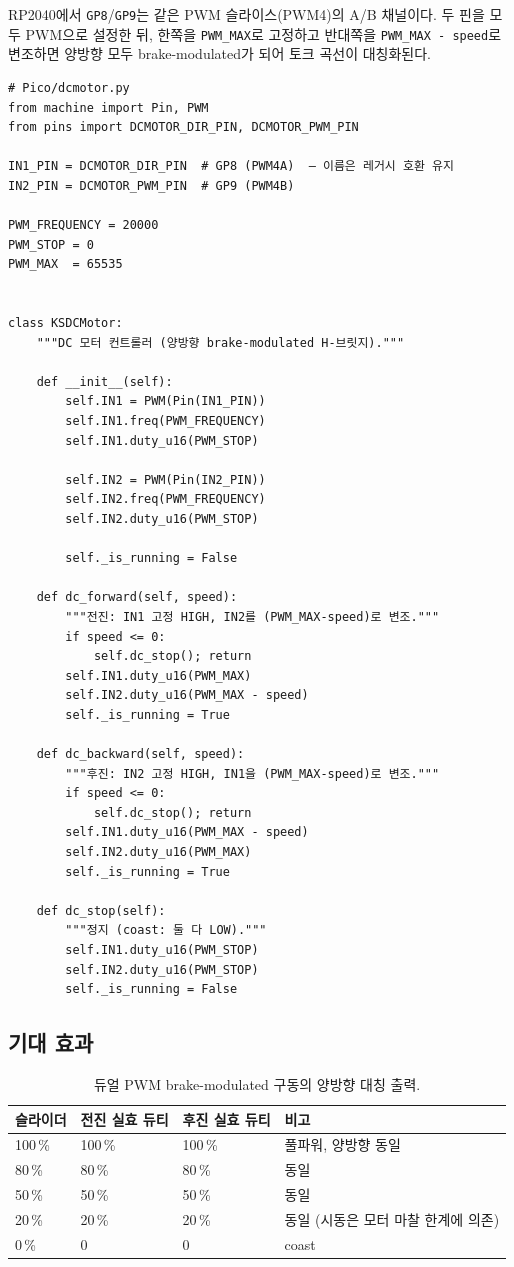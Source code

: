 \documentclass[11pt, oneside]{article}
\begin{document}
RP2040에서 \texttt{GP8}/\texttt{GP9}는 같은 PWM 슬라이스(PWM4)의 A/B
채널이다. 두 핀을 모두 PWM으로 설정한 뒤, 한쪽을 \texttt{PWM\_MAX}로
고정하고 반대쪽을 \texttt{PWM\_MAX - speed}로 변조하면 양방향 모두
brake-modulated가 되어 토크 곡선이 대칭화된다.

\begin{verbatim}
# Pico/dcmotor.py
from machine import Pin, PWM
from pins import DCMOTOR_DIR_PIN, DCMOTOR_PWM_PIN

IN1_PIN = DCMOTOR_DIR_PIN  # GP8 (PWM4A)  — 이름은 레거시 호환 유지
IN2_PIN = DCMOTOR_PWM_PIN  # GP9 (PWM4B)

PWM_FREQUENCY = 20000
PWM_STOP = 0
PWM_MAX  = 65535


class KSDCMotor:
    """DC 모터 컨트롤러 (양방향 brake-modulated H-브릿지)."""

    def __init__(self):
        self.IN1 = PWM(Pin(IN1_PIN))
        self.IN1.freq(PWM_FREQUENCY)
        self.IN1.duty_u16(PWM_STOP)

        self.IN2 = PWM(Pin(IN2_PIN))
        self.IN2.freq(PWM_FREQUENCY)
        self.IN2.duty_u16(PWM_STOP)

        self._is_running = False

    def dc_forward(self, speed):
        """전진: IN1 고정 HIGH, IN2를 (PWM_MAX-speed)로 변조."""
        if speed <= 0:
            self.dc_stop(); return
        self.IN1.duty_u16(PWM_MAX)
        self.IN2.duty_u16(PWM_MAX - speed)
        self._is_running = True

    def dc_backward(self, speed):
        """후진: IN2 고정 HIGH, IN1을 (PWM_MAX-speed)로 변조."""
        if speed <= 0:
            self.dc_stop(); return
        self.IN1.duty_u16(PWM_MAX - speed)
        self.IN2.duty_u16(PWM_MAX)
        self._is_running = True

    def dc_stop(self):
        """정지 (coast: 둘 다 LOW)."""
        self.IN1.duty_u16(PWM_STOP)
        self.IN2.duty_u16(PWM_STOP)
        self._is_running = False
\end{verbatim}

\subsection{기대 효과}

\begin{table}[h]
\centering
\small
\begin{tabularx}{\linewidth}{@{}lXXX@{}}
\toprule
슬라이더 & 전진 실효 듀티 & 후진 실효 듀티 & 비고 \\
\midrule
100\,\% & 100\,\% & 100\,\% & 풀파워, 양방향 동일 \\
80\,\%  & 80\,\%  & 80\,\%  & 동일 \\
50\,\%  & 50\,\%  & 50\,\%  & 동일 \\
20\,\%  & 20\,\%  & 20\,\%  & 동일 (시동은 모터 마찰 한계에 의존) \\
0\,\%   & 0       & 0       & coast \\
\bottomrule
\end{tabularx}
\caption{듀얼 PWM brake-modulated 구동의 양방향 대칭 출력.}
\end{table}
\end{document}
